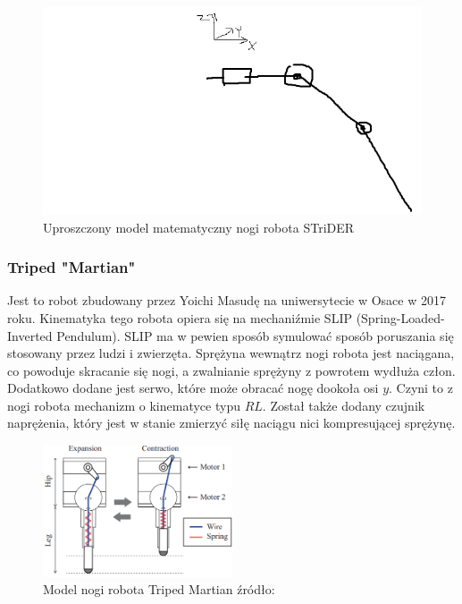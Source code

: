 \documentclass[a4paper,13pt]{article}
\begin{document}
\begin{figure}[H]
\includegraphics[width=\textwidth]{img/strider_math.png}
\caption{Uproszczony model matematyczny nogi robota STriDER}
\label{strider_math}
\end{figure}

\subsubsection{Triped "Martian" }
Jest to robot zbudowany przez Yoichi Masudę na uniwersytecie w Osace w 2017 roku. Kinematyka tego robota opiera się na mechaniźmie SLIP (Spring-Loaded-Inverted Pendulum). SLIP ma w pewien sposób symulować sposób poruszania się stosowany przez ludzi i zwierzęta. Sprężyna wewnątrz nogi robota jest naciągana, co powoduje skracanie się nogi, a zwalnianie sprężyny z powrotem wydłuża człon. Dodatkowo dodane jest serwo, które może obracać nogę dookoła osi $y$. Czyni to z nogi robota mechanizm o kinematyce typu $RL$. Został także dodany czujnik naprężenia, który jest w stanie zmierzyć siłę naciągu nici kompresującej sprężynę. \cite{Triped Martian}\\

\begin{figure}[H]
\includegraphics[width=0.5\textwidth]{img/martian_model.png}
\caption{Model nogi robota Triped Martian źródło: \cite{Triped Martian}}
\label{martian_leg}
\end{figure}
\end{document}

